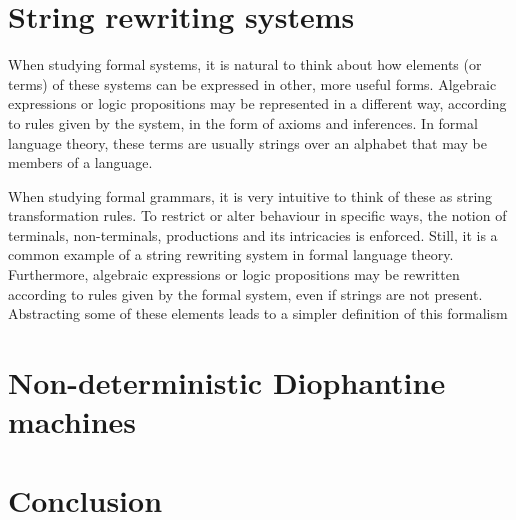 \documentclass[12pt]{article}
\begin{document}
\section{String rewriting systems}\label{sec:srs}

When studying formal systems, it is natural to think about how elements (or terms) of these systems can be expressed in other, more useful forms. Algebraic expressions or logic propositions may be represented in a different way, according to rules given by the system, in the form of axioms and inferences. In formal language theory, these terms are usually strings over an alphabet that may be members of a language.

When studying formal grammars, it is very intuitive to think of these as string transformation rules. To restrict or alter behaviour in specific ways, the notion of terminals, non-terminals, productions and its intricacies is enforced. Still, it is a common example of a string rewriting system in formal language theory. Furthermore, algebraic expressions or logic propositions may be rewritten according to rules given by the formal system, even if strings are not present. Abstracting some of these elements leads to a simpler definition of this formalism


\section{Non-deterministic Diophantine machines}\label{sec:nddm}

\section{Conclusion}\label{sec:conc}



\end{document}
